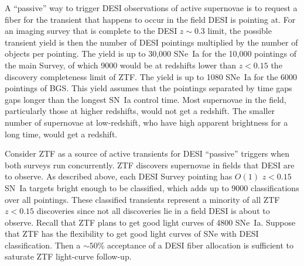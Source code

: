 \documentclass{article}   	%
\begin{document}
A ``passive'' way to trigger DESI observations of active supernovae is to request a fiber for the  transient
that happens to occur in the field DESI is pointing at.  For an imaging survey that is complete to the DESI 
$z\sim0.3$ limit, the possible transient yield is then the number of DESI pointings multiplied by the number of objects per pointing.  
\color{red}
The yield is up to 30,000 SNe~Ia for the 10,000 pointings of the
main Survey, of which 9000 would be at redshifts lower than $z<0.15$ the discovery completeness limit of ZTF.  
The yield is up to 1080 SNe~Ia for the 6000 pointings of BGS. 
\color{black}
This yield assumes that the pointings separated by time gaps gaps longer than the longest SN~Ia control time.
Most supernovae in the field, particularly those at higher redshifts, would not get a redshift.  The smaller number of supernovae at low-redshift, who have high apparent brightness
for a long time, would get a redshift.
%
%

\color{red}
Consider ZTF as a source of active transients for DESI ``passive'' triggers when both surveys run concurrently.
ZTF discovers supernovae in fields that DESI are to observe.
As described above, each DESI Survey pointing has $O(1)$ $z<0.15$ SN~Ia targets bright enough to be classified, which adds up to
9000 classifications over all pointings.  These classified transients represent a minority of all ZTF $z<0.15$ discoveries since 
not all discoveries lie in a field DESI is about to observe.  Recall that ZTF plans to get good light curves of 4800 SNe~Ia.  Suppose
that ZTF has the flexibility to get good light curves of SNe with DESI classification.  Then a $\sim50$\% acceptance of a DESI fiber allocation is sufficient
to saturate ZTF light-curve follow-up.
\end{document}
